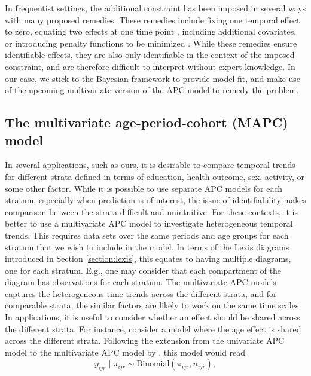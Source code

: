 In frequentist settings, the additional constraint has been imposed in several ways with many proposed remedies. These remedies include fixing one temporal effect to zero, equating two effects at one time point \citep{fienberg1979identification}, including additional covariates, or introducing penalty functions to be minimized \citep{osmond1982age}. While these remedies ensure identifiable effects, they are also only identifiable in the context of the imposed constraint, and are therefore difficult to interpret without expert knowledge. In our case, we stick to the Bayesian framework to provide model fit, and make use of the upcoming multivariate version of the APC model to remedy the problem. 

\subsection{The multivariate age-period-cohort (MAPC) model}
\label{section:multivariate}
In several applications, such as ours, it is desirable to compare temporal trends for different strata defined in terms of education, health outcome, sex, activity, or some other factor. While it is possible to use separate APC models for each stratum, especially when prediction is of interest, the issue of identifiability makes comparison between the strata difficult and unintuitive. For these contexts, it is better to use a multivariate APC model to investigate heterogeneous temporal trends. This requires data sets over the same periods and age groups for each stratum that we wish to include in the model. In terms of the Lexis diagrams introduced in Section \ref{section:lexis}, this equates to having multiple diagrams, one for each stratum. E.g., one may consider that each compartment of the diagram has observations for each stratum. The multivariate APC models captures the heterogeneous time trends across the different strata, and for comparable strata, the similar factors are likely to work on the same time scales. In applications, it is useful to consider whether an effect should be shared across the different strata. For instance, consider a model where the age effect is shared across the different strata. Following the extension from the univariate APC model to the multivariate APC model by \cite{riebler2010multivariate}, this model would read
\begin{equation}
    y_{ijr}\mid \pi_{ijr} \sim \text{Binomial}(\pi_{ijr}, n_{ijr}),
    \label{eqn:likelihood-MAPC}
\end{equation}
